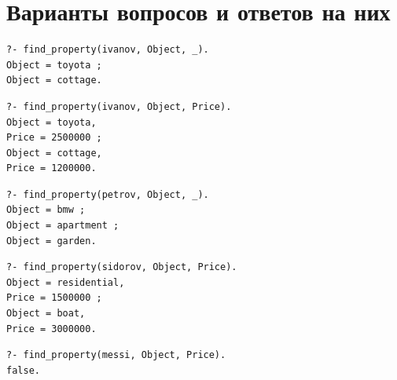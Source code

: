 \section{Варианты вопросов и ответов на них}

\begin{lstlisting}[caption={Вопрос и ответ №1}, label={lst:q1}]
?- find_property(ivanov, Object, _).
Object = toyota ;
Object = cottage.
\end{lstlisting}

\begin{lstlisting}[caption={Вопрос и ответ №2}, label={lst:q2}]
?- find_property(ivanov, Object, Price).
Object = toyota,
Price = 2500000 ;
Object = cottage,
Price = 1200000.
\end{lstlisting}

\begin{lstlisting}[caption={Вопрос и ответ №3}, label={lst:q3}]
?- find_property(petrov, Object, _).
Object = bmw ;
Object = apartment ;
Object = garden.
\end{lstlisting}

\begin{lstlisting}[caption={Вопрос и ответ №4}, label={lst:q4}]
?- find_property(sidorov, Object, Price).
Object = residential,
Price = 1500000 ;
Object = boat,
Price = 3000000.
\end{lstlisting}

\begin{lstlisting}[caption={Вопрос и ответ №5}, label={lst:q5}]
?- find_property(messi, Object, Price).
false.
\end{lstlisting}

\clearpage

